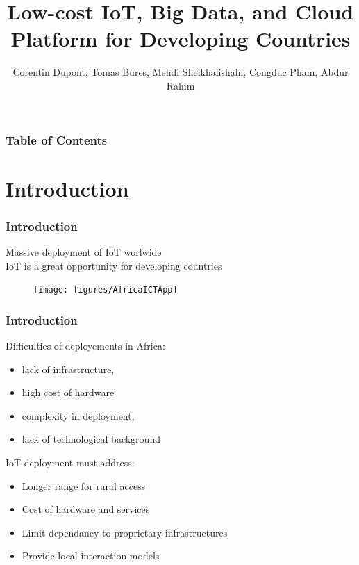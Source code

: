 \documentclass{beamer}
\begin{document}
\title{Low-cost IoT, Big Data, and Cloud Platform for Developing Countries}
\author{Corentin Dupont, Tomas Bures, Mehdi Sheikhalishahi, Congduc Pham, Abdur Rahim}		 



\maketitle

\begin{frame}
  \frametitle{Table of Contents}
  \tableofcontents[]
\end{frame}


\section{Introduction}
\begin{frame}
\frametitle{Introduction}
  Massive deployment of IoT worlwide \\
  IoT is a great opportunity for developing countries

  \begin{figure}[H]  
  \centering  
  \texttt{[image: figures/AfricaICTApp]}  
  \label{figure-AfricaICTApp}  
  \end{figure}

\end{frame}

\begin{frame}
\frametitle{Introduction}
  
  Difficulties of deployements in Africa:
  \begin{itemize}
    \item lack of infrastructure, 
    \item high cost of hardware
    \item complexity in deployment, 
    \item lack of technological background
  \end{itemize}

  IoT deployment must address:
  \begin{itemize}
    \item Longer range for rural access
    \item Cost of hardware and services
    \item Limit dependancy to proprietary infrastructures
    \item Provide local interaction models
  \end{itemize}

\end{frame}
\end{document}
